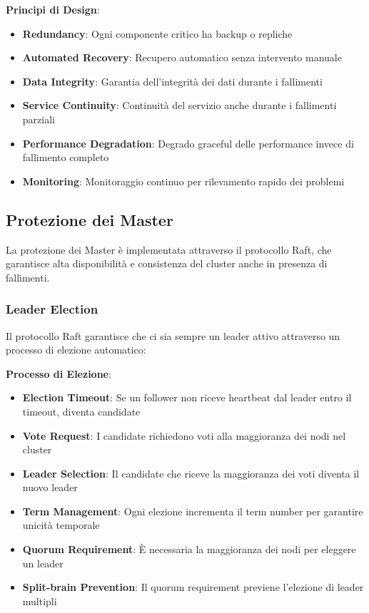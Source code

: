 \documentclass[12pt,a4paper]{article}
\begin{document}
\textbf{Principi di Design}:

\begin{itemize}
\item \textbf{Redundancy}: Ogni componente critico ha backup o repliche
\item \textbf{Automated Recovery}: Recupero automatico senza intervento manuale
\item \textbf{Data Integrity}: Garantia dell'integrità dei dati durante i fallimenti
\item \textbf{Service Continuity}: Continuità del servizio anche durante i fallimenti parziali
\item \textbf{Performance Degradation}: Degrado graceful delle performance invece di fallimento completo
\item \textbf{Monitoring}: Monitoraggio continuo per rilevamento rapido dei problemi
\end{itemize}

\subsection{Protezione dei Master}

La protezione dei Master è implementata attraverso il protocollo Raft, che garantisce alta disponibilità e consistenza del cluster anche in presenza di fallimenti.

\subsubsection{Leader Election}

Il protocollo Raft garantisce che ci sia sempre un leader attivo attraverso un processo di elezione automatico:

\textbf{Processo di Elezione}:
\begin{itemize}
\item \textbf{Election Timeout}: Se un follower non riceve heartbeat dal leader entro il timeout, diventa candidate
\item \textbf{Vote Request}: I candidate richiedono voti alla maggioranza dei nodi nel cluster
\item \textbf{Leader Selection}: Il candidate che riceve la maggioranza dei voti diventa il nuovo leader
\item \textbf{Term Management}: Ogni elezione incrementa il term number per garantire unicità temporale
\item \textbf{Quorum Requirement}: È necessaria la maggioranza dei nodi per eleggere un leader
\item \textbf{Split-brain Prevention}: Il quorum requirement previene l'elezione di leader multipli
\end{itemize}
\end{document}
